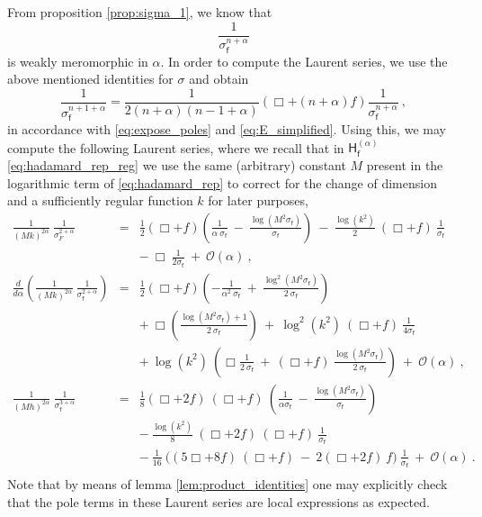 \documentclass[12pt]{book}
\newcommand{\Ocal}{\mathcal{O}}
\newcommand{\Hsf}{\mathsf{H}}
\newcommand{\fsf}{\mathsf{f}}
\theoremstyle{break}
\begin{document}
From proposition \ref{prop:sigma_1}, we know that
%
\begin{equation*}
\frac{1}{\sigma^{n+\alpha}_\fsf} 
\end{equation*}
%
is weakly meromorphic in $\alpha$. In order to compute the Laurent series, we use the above mentioned identities for $\sigma$ and obtain
%
\begin{equation*}
\frac{1}{\sigma^{n+1+\alpha}_\fsf} = \frac{1}{2(n+\alpha)(n-1+\alpha)} \left(\Box+(n+\alpha)f\right) \frac{1}{\sigma^{n+\alpha}_\fsf} \ ,
\end{equation*}
%
in accordance with \eqref{eq:expose_poles} and \eqref{eq:E_simplified}. Using this, we may compute the following Laurent series, where we recall that in $\Hsf^{(\alpha)}_\fsf$ \eqref{eq:hadamard_rep_reg} we use the same (arbitrary) constant $M$ present in the logarithmic term  of \eqref{eq:hadamard_rep} to correct for the change of dimension and a sufficiently regular function $k$ for later purposes,
%
\begin{eqnarray}
\frac{1}{(Mk)^{2\alpha}} \ \frac{1}{\sigma^{2+\alpha}_F} &=& \frac12 \left(\Box+f\right) \left( \frac{1}{\alpha \ \sigma_\fsf} \ - \ \frac{\log\left(M^2 \sigma_\fsf\right)}{\sigma_\fsf}\right) \ - \ \frac{\log(k^2)}{2} \ \left(\Box+f\right) \ \frac{1}{\sigma_\fsf} \nonumber \\
&& - \ \Box \ \frac{1}{2\sigma_\fsf} \ + \ \Ocal(\alpha) \ , \nonumber \\
%
%
\frac{d}{d\alpha} \left( \frac{1}{(Mk)^{2\alpha}} \ \frac{1}{\sigma^{2+\alpha}_\fsf} \right) &=& \frac12 \left(\Box+f\right) \left(-\frac{1}{\alpha^2 \ \sigma_\fsf} \ + \ \frac{\log^2\left(M^2 \sigma_\fsf\right)}{2 \ \sigma_\fsf}\right)  \nonumber \\
&& + \ \Box\left(\frac{\log\left(M^2 \sigma_\fsf\right)+1}{2 \ \sigma_\fsf}\right) \ + \ \log^2(k^2) \ \left(\Box+f\right) \ \frac{1}{4\sigma_\fsf} \nonumber \\
&& + \ \log(k^2) \ \left(\Box\frac{1}{2 \ \sigma_\fsf} \ + \ \left(\Box+f\right) \ \frac{\log\left(M^2 \sigma_\fsf\right)}{2 \ \sigma_\fsf}\right) \ + \ \Ocal(\alpha) \ , \nonumber \\
%
%
\frac{1}{(M h)^{2\alpha}} \ \frac{1}{\sigma^{3+\alpha}_\fsf} &=& \frac18 \left(\Box+2f\right) \ \left(\Box+f\right) \ \left(\frac{1}{\alpha\sigma_\fsf} \ - \ \frac{\log \left(M^2 \sigma_\fsf\right)}{\sigma_\fsf}\right) \nonumber \\
&& - \ \frac{\log(k^2)}{8} \ (\Box+2f) \ (\Box+f) \ \frac{1}{\sigma_\fsf} \nonumber \\
&& - \ \frac{1}{16} \ \bigg( (5\Box+8f) \ (\Box+f) \ - \ 2 (\Box+2f) \ f \bigg) \ \frac{1}{\sigma_\fsf} \ + \ \Ocal(\alpha) \ . \nonumber \\
\label{eq:general_expansion}
\end{eqnarray}
%
Note that by means of lemma \ref{lem:product_identities} one may explicitly check that the pole terms in these Laurent series are local expressions as expected.
\end{document}
